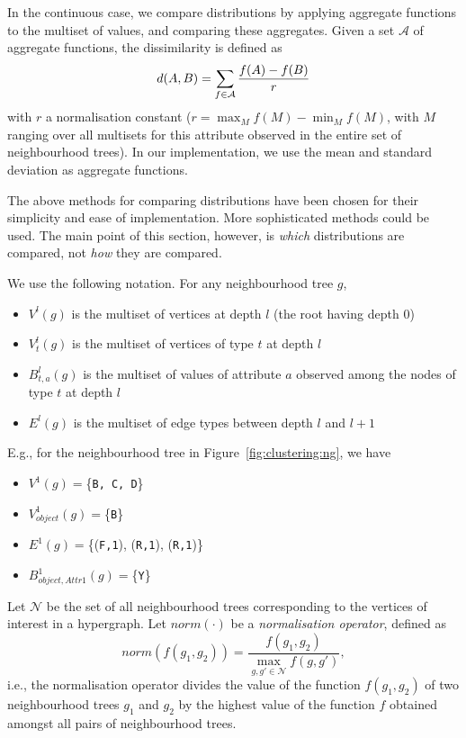 In the continuous case, we compare distributions by applying aggregate functions to the multiset of values, and comparing these aggregates.  
Given a set $\mathcal{A}$ of aggregate functions, the dissimilarity is defined as
\begin{equation}
    d(A,B) = \sum_{f \in \mathcal{A}} {f(A)-f(B) \over r }
\end{equation}
with $r$ a normalisation constant ($r = \max_M f(M) - \min_M f(M)$, with $M$ ranging over all multisets for this attribute observed in the entire set of neighbourhood trees).
In our implementation, we use the mean and standard deviation as aggregate functions.


The above methods for comparing distributions have been chosen for their simplicity and ease of implementation.  More sophisticated methods could be used.  
The main point of this section, however, is {\em which} distributions are compared, not {\em how} they are compared. 


We use the following notation.  For any neighbourhood tree $g$,
\begin{itemize}
\item[\textbullet] $V^l(g)$ is the multiset of vertices at depth $l$ (the root having depth 0)
\item[\textbullet] $V^l_t(g)$ is the multiset of vertices of type $t$ at depth $l$ 
\item[\textbullet] $B^l_{t,a}(g)$ is the multiset of values of attribute $a$ observed among the nodes of type $t$ at depth $l$
\item[\textbullet] $E^l(g)$ is the multiset of edge types between depth $l$ and $l+1$
\end{itemize}

E.g., for the neighbourhood tree in Figure~\ref{fig:clustering:ng}, we have
\begin{itemize}
    \item[\textbullet] $V^1(g) = $\{{\tt B, C, D}\}
    \item[\textbullet] $V^1_{object}(g) = $\{{\tt B}\}
    \item[\textbullet] $E^1(g) = $\{({\tt F,1}), ({\tt R,1}), ({\tt R,1})\}
    \item[\textbullet] $B^1_{object,Attr1}(g) = $\{{\tt Y}\} 
\end{itemize}
\vspace{2pt}


Let $\mathcal{N}$ be the set of all neighbourhood trees corresponding to the vertices of interest in a hypergraph.
Let $norm(\cdot)$ be a \textit{normalisation operator}, defined as $$norm(f(g_1,g_2)) = \frac{f(g_1,g_2)}{\underset{g,g' \in \mathcal{N}}{\max} f(g,g')},$$ i.e., the normalisation operator divides the value of the function $f(g_1,g_2)$ of two neighbourhood trees $g_1$ and $g_2$ by the highest value of the function $f$ obtained amongst all pairs of neighbourhood trees.



